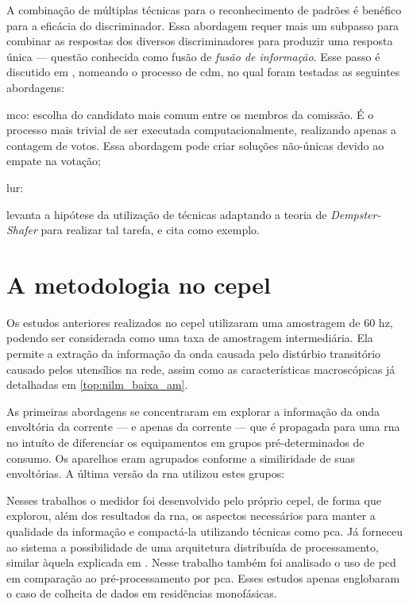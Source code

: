 
A combinação de múltiplas técnicas para o reconhecimento de padrões é
benéfico para a eficácia do discriminador. Essa abordagem requer mais
um subpasso para combinar as respostas dos diversos discriminadores
para produzir uma resposta única --- questão conhecida como fusão de
\emph{fusão de informação}. Esse passo é discutido em
\cite{nilm_liang_pt1_2010_34}, nomeando o processo de \gls{cdm}, no
qual foram testadas as seguintes abordagens:

\begin{description}
\item \gls{mco}: escolha do candidato mais comum entre os
membros da comissão. É o processo mais trivial de ser executada
computacionalmente, realizando apenas a contagem de votos. Essa
abordagem pode criar soluções não-únicas devido ao empate na votação;
\item \gls{lur}:
\end{description}

\cite{nilm_zeifman_review_2011} levanta a hipótese da utilização de
técnicas adaptando a teoria de \emph{Dempster-Shafer} para realizar
tal tarefa, e cita \cite{information_fusion_basir_2007_40} como
exemplo. 
\cite{nilm_zeifman_review_2011} 

\section[A metodologia no CEPEL]{A metodologia no \acrshort{cepel}}
\label{sec:nilm_cepel}

Os estudos anteriores realizados no \gls{cepel}
\cite{nilm_cepel_alvaro,nilm_cepel_bezerra,nilm_cepel_aguiar}
utilizaram uma amostragem de 60 \acrshort{hz}, podendo ser considerada
como uma taxa de amostragem intermediária. Ela permite a extração 
da informação da onda causada pelo distúrbio transitório causado pelos
utensílios na rede, assim como as características macroscópicas já
detalhadas em \ref{top:nilm_baixa_am}. 

As primeiras abordagens se concentraram em explorar a informação da
onda envoltória da corrente --- e apenas da corrente --- que é
propagada para uma \gls{rna} no intuíto de diferenciar os equipamentos
em grupos pré-determinados de consumo. Os aparelhos eram agrupados
conforme a similiridade de suas envoltórias. A última versão da
\gls{rna} utilizou estes grupos:


Nesses trabalhos o medidor foi desenvolvido pelo próprio \gls{cepel},
de forma que \cite{nilm_cepel_aguiar} explorou, além dos resultados
da \gls{rna}, os aspectos necessários para manter a
qualidade da informação e compactá-la utilizando técnicas como
\gls{pca}. Já \cite{nilm_cepel_bezerra} forneceu ao sistema a
possibilidade de uma arquitetura distribuída de processamento, similar
àquela explicada em \cite{nilm_bergman_distribuido_2011}. Nesse
trabalho também foi analisado o uso de \gls{pcd} em comparação ao
pré-processamento por \gls{pca}. Esses estudos apenas englobaram o
caso de colheita de dados em residências monofásicas.

